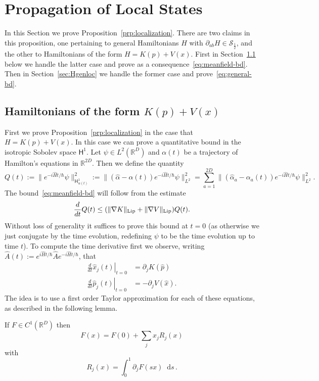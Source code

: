 \documentclass[11pt]{amsart}
\def\Sobolev{{\mathsf{H}}}
\def\Real{{\mathbb R}}
\newcommand{\diff}{\mathop{}\!\mathrm{d}}
\newcommand{\mcal}[1]{{\mathcal{#1}}}
\numberwithin{equation}{section}
\begin{document}
\section{Propagation of Local States}
\label{sec:localized-evol}

In this Section we prove Proposition~\ref{prp:localization}.  There are two claims in this proposition,
one pertaining to general Hamiltonians $H$ with $\partial_{ab}H\in\mcal{S}_{\frac12}$, and the other to
Hamiltonians of the form $H=K(p)+V(x)$.  First in Section~\ref{sec:KV} below we handle the latter case
and prove as a consequence~\eqref{eq:meanfield-bd}.  Then in Section~\ref{sec:Hgenloc} we handle the former
case and prove~\eqref{eq:general-bd}.

\subsection{Hamiltonians of the form $K(p)+V(x)$}
\label{sec:KV}
First we prove Proposition~\ref{prp:localization} in the case that $H=K(p)+ V(x)$.  In this case we can prove
a quantitative bound in the isotropic Sobolev space $\Sobolev^1$.  Let $\psi\in L^2(\Real^D)$ and
$\alpha(t)$ be a trajectory of Hamilton's equations in $\Real^{2D}$.  Then we define the quantity
\[
Q(t) :=
\|e^{-i\hat{H}t/\hbar}\psi\|_{\Sobolev^1_{\alpha(t)}}^2  := \| (\hat{\alpha}-\alpha(t)) e^{-i\hat{H}t/\hbar}\psi\|_{L^2}^2
= \sum_{a=1}^{2D} \|(\hat{\alpha}_{a} - \alpha_a(t)) e^{-i\hat{H}t/\hbar}\psi\|_{L^2}^2.
\]
The bound~\eqref{eq:meanfield-bd} will follow from the estimate
\[
\frac{d}{dt} Q(t) \leq (\|\nabla K\|_{\rm Lip} + \|\nabla V\|_{\rm Lip}) Q(t).
\]
Without loss of generality it suffices to prove this bound at $t=0$ (as otherwise we just conjugate by the
time evolution, redefining $\psi$ to be the time evolution up to time $t$).  To compute the time derivative first
we observe, writing $\hat{A}(t) := e^{i\hat{H}t/\hbar} \hat{A} e^{-i\hat{H}t/\hbar}$, that
\begin{align*}
\left. \frac{d}{dt}\hat{x}_j(t)\right|_{t=0} &= \partial_j K(\hat{p}) \\
\left. \frac{d}{dt}\hat{p}_j(t)\right|_{t=0} &= -\partial_j V(\hat{x}).
\end{align*}
The idea is to use a first order Taylor approximation for each of these equations, as described in the following lemma.
\begin{lemma}
\label{lem:taylor}
If $F\in C^1(\Real^D)$ then
\begin{equation}
\label{eq:F-remainder}
F(x) = F(0) + \sum_j x_j R_j(x)
\end{equation}
with
\begin{equation}
\label{eq:Rjdef}
R_j(x) = \int_0^1 \partial_j F(sx)\diff s\,.
\end{equation}
\end{lemma}
\end{document}
